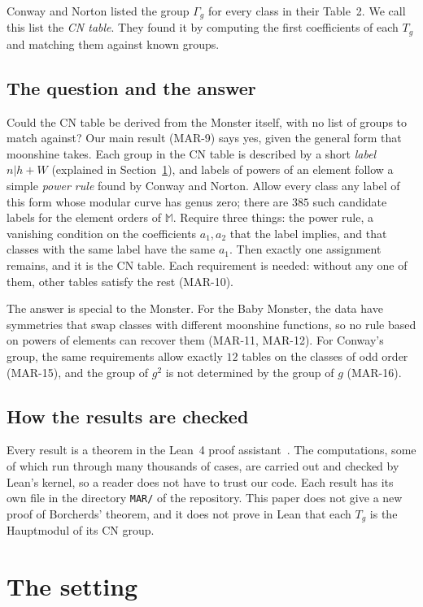 \documentclass[11pt]{amsart}
\theoremstyle{definition}
\newcommand{\M}{\mathbb{M}}
\begin{document}
Conway and Norton listed the group $\Gamma_g$ for every class in their Table~2. We call this list the \emph{CN table}. They found it by computing the first coefficients of each $T_g$ and matching them against known groups.

\subsection{The question and the answer}
Could the CN table be derived from the Monster itself, with no list of groups to match against? Our main result (MAR-9) says yes, given the general form that moonshine takes. Each group in the CN table is described by a short \emph{label} $n|h+W$ (explained in Section~\ref{sec:setting}), and labels of powers of an element follow a simple \emph{power rule} found by Conway and Norton. Allow every class any label of this form whose modular curve has genus zero; there are $385$ such candidate labels for the element orders of $\M$. Require three things: the power rule, a vanishing condition on the coefficients $a_1,a_2$ that the label implies, and that classes with the same label have the same $a_1$. Then exactly one assignment remains, and it is the CN table. Each requirement is needed: without any one of them, other tables satisfy the rest (MAR-10).

The answer is special to the Monster. For the Baby Monster, the data have symmetries that swap classes with different moonshine functions, so no rule based on powers of elements can recover them (MAR-11, MAR-12). For Conway's group, the same requirements allow exactly $12$ tables on the classes of odd order (MAR-15), and the group of $g^2$ is not determined by the group of $g$ (MAR-16).

\subsection{How the results are checked}
Every result is a theorem in the Lean~4 proof assistant~\cite{repo}. The computations, some of which run through many thousands of cases, are carried out and checked by Lean's kernel, so a reader does not have to trust our code. Each result has its own file in the directory \texttt{MAR/} of the repository. This paper does not give a new proof of Borcherds' theorem, and it does not prove in Lean that each $T_g$ is the Hauptmodul of its CN group.

\section{The setting}\label{sec:setting}
\end{document}
